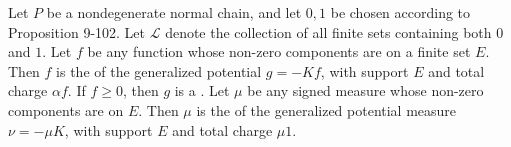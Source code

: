 Let $P$ be a nondegenerate normal chain, and let $0,1$ be chosen according to Proposition 9-102. Let $\mathcal{L}$ denote the collection of all finite sets containing both $0$ and $1$. Let $f$ be any function whose non-zero components are on a finite set $E$. Then $f$ is the  of the generalized potential $g = -Kf$, with support $E$ and total charge $\alpha f$. If $f \geq 0$, then $g$ is a . Let $\mu$ be any signed measure whose non-zero components are on $E$. Then $\mu$ is the  of the generalized potential measure $\nu = -\mu K$, with support $E$ and total charge $\mu 1$.
